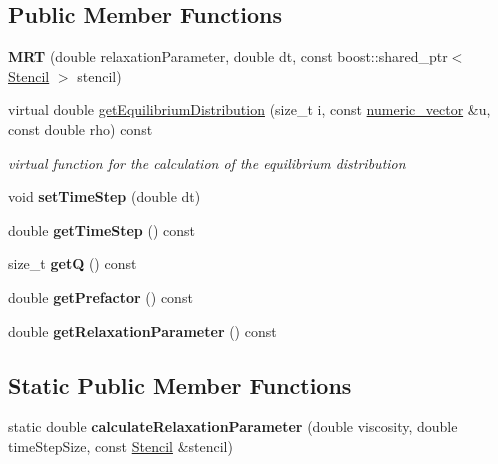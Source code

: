\subsection*{Public Member Functions}
\begin{DoxyCompactItemize}
\item 
\hypertarget{classnatrium_1_1MRT_a48bf35d2c4142b066d739c875476c014}{
{\bfseries MRT} (double relaxationParameter, double dt, const boost::shared\_\-ptr$<$ \hyperlink{classnatrium_1_1Stencil}{Stencil} $>$ stencil)}
\label{classnatrium_1_1MRT_a48bf35d2c4142b066d739c875476c014}

\item 
virtual double \hyperlink{classnatrium_1_1MRT_a3f96915f9f67680f4a1d7b952e70be55}{getEquilibriumDistribution} (size\_\-t i, const \hyperlink{namespacenatrium_a67c39077adc6634f8fa3762b8eef24c4}{numeric\_\-vector} \&u, const double rho) const 
\begin{DoxyCompactList}\small\item\em virtual function for the calculation of the equilibrium distribution \item\end{DoxyCompactList}\item 
\hypertarget{classnatrium_1_1MRT_aaaa7b9eac3ef3ef3f77b9de2df38ac8c}{
void {\bfseries setTimeStep} (double dt)}
\label{classnatrium_1_1MRT_aaaa7b9eac3ef3ef3f77b9de2df38ac8c}

\item 
\hypertarget{classnatrium_1_1MRT_af5071fe45b44df6a7276601448184634}{
double {\bfseries getTimeStep} () const }
\label{classnatrium_1_1MRT_af5071fe45b44df6a7276601448184634}

\item 
\hypertarget{classnatrium_1_1MRT_a9d855516e1b76f90b4cd4b470260dadf}{
size\_\-t {\bfseries getQ} () const }
\label{classnatrium_1_1MRT_a9d855516e1b76f90b4cd4b470260dadf}

\item 
\hypertarget{classnatrium_1_1MRT_a7d8213b0eb352329f0d21cb86ebccc30}{
double {\bfseries getPrefactor} () const }
\label{classnatrium_1_1MRT_a7d8213b0eb352329f0d21cb86ebccc30}

\item 
\hypertarget{classnatrium_1_1MRT_ad5ed25948b4e6f391ea206fa3a11688b}{
double {\bfseries getRelaxationParameter} () const }
\label{classnatrium_1_1MRT_ad5ed25948b4e6f391ea206fa3a11688b}

\end{DoxyCompactItemize}
\subsection*{Static Public Member Functions}
\begin{DoxyCompactItemize}
\item 
\hypertarget{classnatrium_1_1MRT_aa7bf1bb5e4ff004480e2dd42fc95bf0c}{
static double {\bfseries calculateRelaxationParameter} (double viscosity, double timeStepSize, const \hyperlink{classnatrium_1_1Stencil}{Stencil} \&stencil)}
\label{classnatrium_1_1MRT_aa7bf1bb5e4ff004480e2dd42fc95bf0c}

\end{DoxyCompactItemize}


